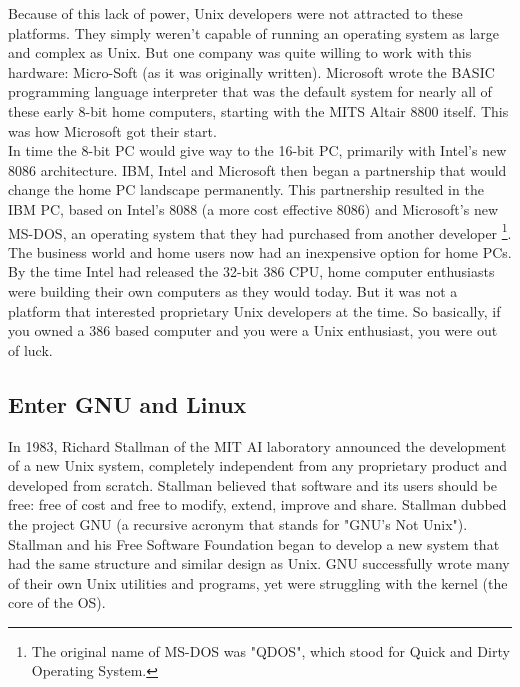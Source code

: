 Because of this lack of power, Unix developers were not attracted to these platforms.  They simply weren't capable of running an operating system as large and complex as Unix.  But one company was quite willing to work with this hardware: Micro-Soft (as it was originally written).  Microsoft wrote the BASIC programming language interpreter that was the default system for nearly all of these early 8-bit home computers, starting with the MITS Altair 8800 itself.  This was how Microsoft got their start.\\

In time the 8-bit PC would give way to the 16-bit PC, primarily with Intel's new 8086 architecture.  IBM, Intel and Microsoft then began a partnership that would change the home PC landscape permanently.  This partnership resulted in the IBM PC, based on Intel's 8088 (a more cost effective 8086) and Microsoft's new MS-DOS, an operating system that they had purchased from another developer \footnote{The original name of MS-DOS was "QDOS", which stood for Quick and Dirty Operating System.}.\\

The business world and home users now had an inexpensive option for home PCs. By the time Intel had released the 32-bit 386 CPU, home computer enthusiasts were building their own computers as they would today.  But it was not a platform that interested proprietary Unix developers at the time.  So basically, if you owned a 386 based computer and you were a Unix enthusiast, you were out of luck.

\subsection{Enter GNU and Linux}

In 1983, Richard Stallman of the MIT AI laboratory announced the development of a new Unix system, completely independent from any proprietary product and developed from scratch.  Stallman believed that software and its users should be free: free of cost and free to modify, extend, improve and share.  Stallman dubbed the project GNU (a recursive acronym that stands for "GNU's Not Unix").\\

Stallman and his Free Software Foundation began to develop a new system that had the same structure and similar design as Unix.  GNU successfully wrote many of their own Unix utilities and programs, yet were struggling with the kernel (the core of the OS).\\

